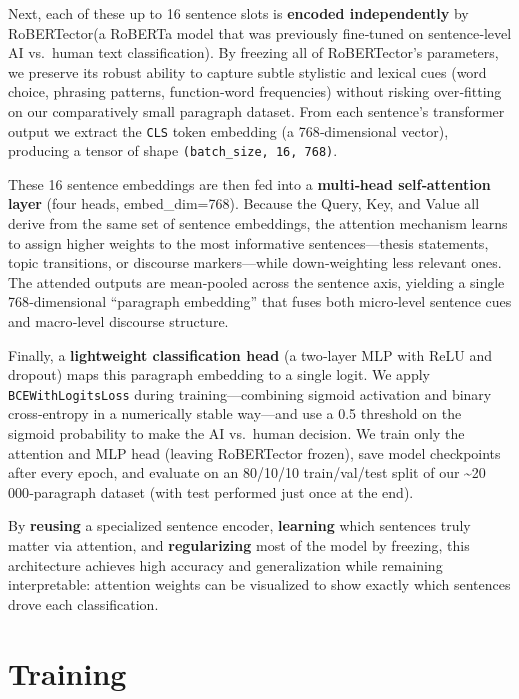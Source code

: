 \documentclass[
]{article}
\begin{document}
Next, each of these up to 16 sentence slots is \textbf{encoded
independently} by RoBERTector(a RoBERTa model that was previously
fine‑tuned on sentence‑level AI vs.~human text classification). By
freezing all of RoBERTector's parameters, we preserve its robust ability
to capture subtle stylistic and lexical cues (word choice, phrasing
patterns, function‐word frequencies) without risking over‑fitting on our
comparatively small paragraph dataset. From each sentence's transformer
output we extract the \texttt{CLS} token embedding (a 768‑dimensional
vector), producing a tensor of shape \texttt{(batch\_size,\ 16,\ 768)}.

These 16 sentence embeddings are then fed into a \textbf{multi‑head
self‑attention layer} (four heads, embed\_dim=768). Because the Query,
Key, and Value all derive from the same set of sentence embeddings, the
attention mechanism learns to assign higher weights to the most
informative sentences---thesis statements, topic transitions, or
discourse markers---while down‑weighting less relevant ones. The
attended outputs are mean‑pooled across the sentence axis, yielding a
single 768‑dimensional ``paragraph embedding'' that fuses both
micro‑level sentence cues and macro‑level discourse structure.

Finally, a \textbf{lightweight classification head} (a two‑layer MLP
with ReLU and dropout) maps this paragraph embedding to a single logit.
We apply \texttt{BCEWithLogitsLoss} during training---combining sigmoid
activation and binary cross‑entropy in a numerically stable way---and
use a 0.5 threshold on the sigmoid probability to make the AI vs.~human
decision. We train only the attention and MLP head (leaving RoBERTector
frozen), save model checkpoints after every epoch, and evaluate on an
80/10/10 train/val/test split of our \textasciitilde20\,000‑paragraph
dataset (with test performed just once at the end).

By \textbf{reusing} a specialized sentence encoder, \textbf{learning}
which sentences truly matter via attention, and \textbf{regularizing}
most of the model by freezing, this architecture achieves high accuracy
and generalization while remaining interpretable: attention weights can
be visualized to show exactly which sentences drove each classification.

\section{Training}\label{training}
\end{document}
